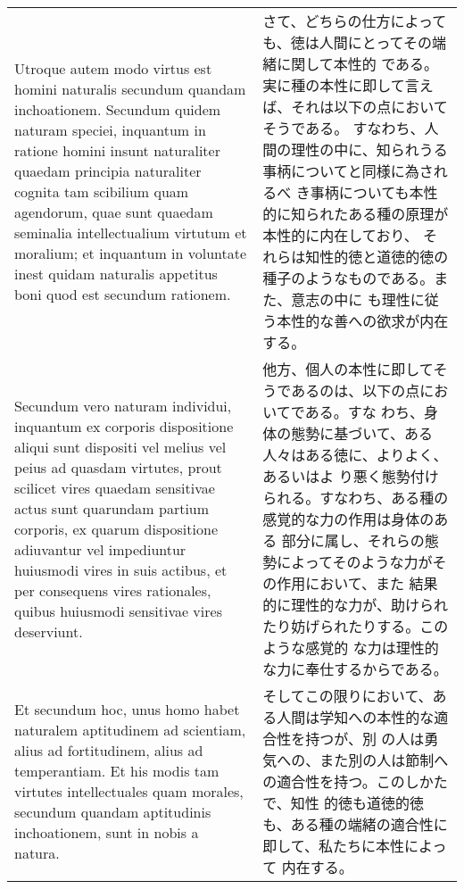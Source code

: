 \documentclass[10pt]{jsarticle}
\begin{document}
\begin{longtable}{p{21em}p{21em}}
\\

 Utroque autem modo virtus est homini naturalis secundum quandam
 inchoationem. Secundum quidem naturam speciei, inquantum in ratione
 homini insunt naturaliter quaedam principia naturaliter cognita tam
 scibilium quam agendorum, quae sunt quaedam seminalia intellectualium
 virtutum et moralium; et inquantum in voluntate inest quidam
 naturalis appetitus boni quod est secundum rationem.


&

 さて、どちらの仕方によっても、徳は人間にとってその端緒に関して本性的
 である。実に種の本性に即して言えば、それは以下の点においてそうである。
 すなわち、人間の理性の中に、知られうる事柄についてと同様に為されるべ
 き事柄についても本性的に知られたある種の原理が本性的に内在しており、
 それらは知性的徳と道徳的徳の種子のようなものである。また、意志の中に
 も理性に従う本性的な善への欲求が内在する。
 

 
\\

 Secundum vero naturam individui, inquantum ex corporis dispositione
 aliqui sunt dispositi vel melius vel peius ad quasdam virtutes, prout
 scilicet vires quaedam sensitivae actus sunt quarundam partium
 corporis, ex quarum dispositione adiuvantur vel impediuntur huiusmodi
 vires in suis actibus, et per consequens vires rationales, quibus
 huiusmodi sensitivae vires deserviunt.

&

 他方、個人の本性に即してそうであるのは、以下の点においてである。すな
 わち、身体の態勢に基づいて、ある人々はある徳に、よりよく、あるいはよ
 り悪く態勢付けられる。すなわち、ある種の感覚的な力の作用は身体のある
 部分に属し、それらの態勢によってそのような力がその作用において、また
 結果的に理性的な力が、助けられたり妨げられたりする。このような感覚的
 な力は理性的な力に奉仕するからである。

 
\\


 Et secundum hoc, unus homo habet naturalem aptitudinem ad scientiam,
 alius ad fortitudinem, alius ad temperantiam. Et his modis tam
 virtutes intellectuales quam morales, secundum quandam aptitudinis
 inchoationem, sunt in nobis a natura.


&

 そしてこの限りにおいて、ある人間は学知への本性的な適合性を持つが、別
 の人は勇気への、また別の人は節制への適合性を持つ。このしかたで、知性
 的徳も道徳的徳も、ある種の端緒の適合性に即して、私たちに本性によって
 内在する。


\end{longtable}
\end{document}
